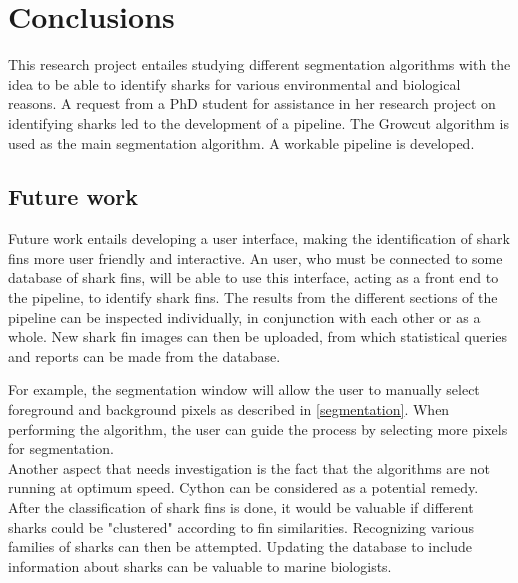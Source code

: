 \documentclass[a4paper,10pt]{article}
\begin{document}
\newpage
\section{Conclusions}
This research project entailes studying different segmentation algorithms with the idea to be able to identify sharks for various environmental and biological reasons.
A request from a PhD student for assistance in her research project on identifying sharks led to the development of a pipeline. The Growcut algorithm is used as the main segmentation algorithm. A workable pipeline is developed. \\

\subsection{Future work}
Future work entails developing a user
interface, making the identification of shark fins more user friendly and interactive.
An user, who must be connected to some database of shark fins, will be able to
use this interface, acting as a front end to the
  pipeline, to identify shark fins.  The
results from the different sections of the pipeline can be
  inspected individually, in
conjunction with each other or as a whole.  New shark fin images can then be
uploaded, from which statistical queries and reports can be
made from the database.

For example, the segmentation window will allow the user to manually select foreground and background pixels as described in \ref{segmentation}.
When performing the algorithm, the user can guide the process by selecting more pixels for segmentation. \\

Another aspect that needs investigation is the fact that the algorithms are not
running at optimum speed.  Cython can be considered
as a potential remedy. \\

After the classification of shark fins is done, it would be valuable if different sharks could be "clustered" according to fin similarities.
Recognizing various families of sharks can then be attempted.  Updating the database to include information about sharks can be valuable to marine biologists.  \\

\newpage

\end{document}

